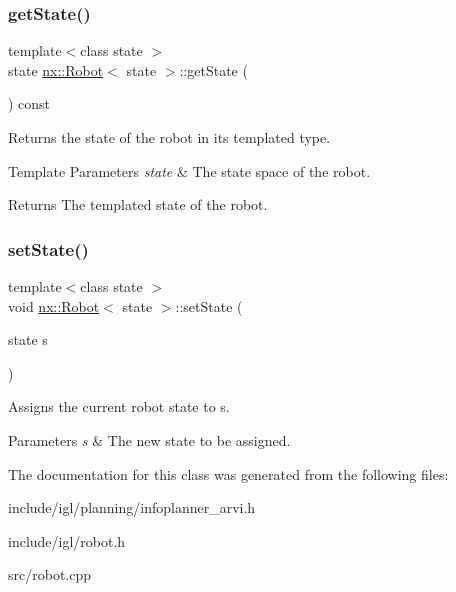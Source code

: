 \subsubsection{\texorpdfstring{get\+State()}{getState()}}
{\footnotesize\ttfamily template$<$class state $>$ \\
state \hyperlink{classnx_1_1Robot}{nx\+::\+Robot}$<$ state $>$\+::get\+State (\begin{DoxyParamCaption}{ }\end{DoxyParamCaption}) const}

Returns the state of the robot in its templated type. 
\begin{DoxyTemplParams}{Template Parameters}
{\em state} & The state space of the robot. \\
\hline
\end{DoxyTemplParams}
\begin{DoxyReturn}{Returns}
The templated state of the robot. 
\end{DoxyReturn}
\mbox{\label{classnx_1_1Robot_a36d91b220aa89ec1f654fd225cb54757}} 
\subsubsection{\texorpdfstring{set\+State()}{setState()}}
{\footnotesize\ttfamily template$<$class state $>$ \\
void \hyperlink{classnx_1_1Robot}{nx\+::\+Robot}$<$ state $>$\+::set\+State (\begin{DoxyParamCaption}\item[{state}]{s }\end{DoxyParamCaption})}

Assigns the current robot state to s. 
\begin{DoxyParams}{Parameters}
{\em s} & The new state to be assigned. \\
\hline
\end{DoxyParams}


The documentation for this class was generated from the following files\+:\begin{DoxyCompactItemize}
\item 
include/igl/planning/infoplanner\+\_\+arvi.\+h\item 
include/igl/robot.\+h\item 
src/robot.\+cpp\end{DoxyCompactItemize}
